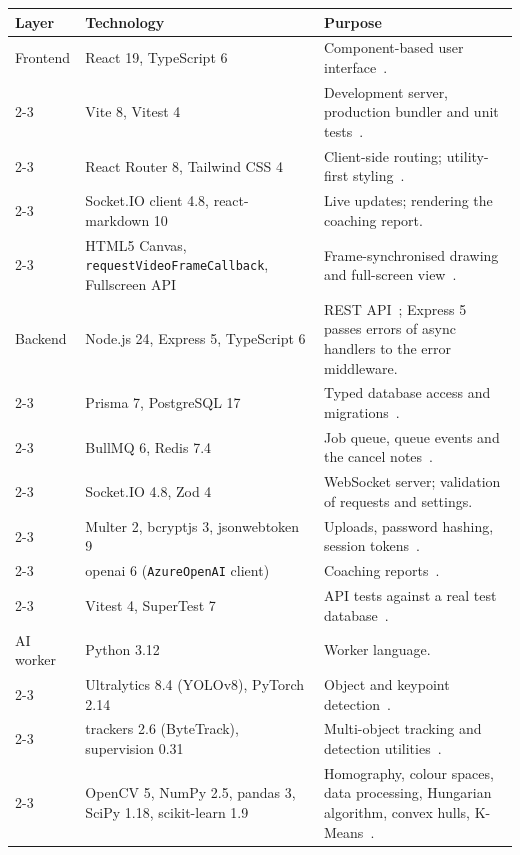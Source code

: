 \begin{longtable}{|p{}|p{}|p{}|}
	\hline
	\textbf{Layer} & \textbf{Technology} & \textbf{Purpose} \\
	\hline
	\endhead
	Frontend & React 19, TypeScript 6 & Component-based user interface~\cite{react}. \\
	\cline{2-3}
	& Vite 8, Vitest 4 & Development server, production bundler and unit tests~\cite{vite,vitest}. \\
	\cline{2-3}
	& React Router 8, Tailwind CSS 4 & Client-side routing; utility-first styling~\cite{tailwind}. \\
	\cline{2-3}
	& Socket.IO client 4.8, react-markdown 10 & Live updates; rendering the coaching report. \\
	\cline{2-3}
	& HTML5 Canvas, \texttt{request\allowbreak{}Video\allowbreak{}Frame\allowbreak{}Callback}, Fullscreen API & Frame-synchronised drawing and full-screen view~\cite{rvfc}. \\
	\hline
	Backend & Node.js 24, Express 5, TypeScript 6 & REST API~\cite{express}; Express 5 passes errors of async handlers to the error middleware. \\
	\cline{2-3}
	& Prisma 7, PostgreSQL 17 & Typed database access and migrations~\cite{prisma,postgres}. \\
	\cline{2-3}
	& BullMQ 6, Redis 7.4 & Job queue, queue events and the cancel notes~\cite{bullmq,redis}. \\
	\cline{2-3}
	& Socket.IO 4.8, Zod 4 & WebSocket server; validation of requests and settings. \\
	\cline{2-3}
	& Multer 2, bcryptjs 3, jsonwebtoken 9 & Uploads, password hashing, session tokens~\cite{jwt}. \\
	\cline{2-3}
	& openai 6 (\texttt{AzureOpenAI} client) & Coaching reports~\cite{azureopenai}. \\
	\cline{2-3}
	& Vitest 4, SuperTest 7 & API tests against a real test database~\cite{vitest,supertest}. \\
	\hline
	AI worker & Python 3.12 & Worker language. \\
	\cline{2-3}
	& Ultralytics 8.4 (YOLOv8), PyTorch 2.14 & Object and keypoint detection~\cite{yolov8,pytorch}. \\
	\cline{2-3}
	& trackers 2.6 (ByteTrack), supervision 0.31 & Multi-object tracking and detection utilities~\cite{bytetrack,supervision}. \\
	\cline{2-3}
	& OpenCV 5, NumPy 2.5, pandas 3, SciPy 1.18, scikit-learn 1.9 & Homography, colour spaces, data processing, Hungarian algorithm, convex hulls, K-Means~\cite{opencv,sklearn}. \\

\end{longtable}
